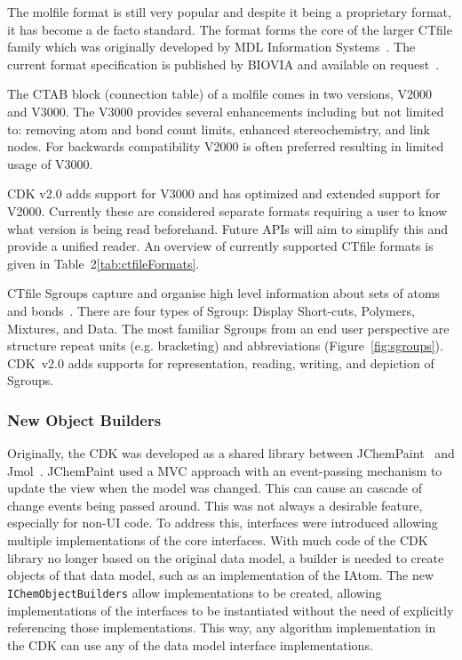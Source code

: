 \documentclass[doublespacing]{bmcart}
\def \cdkversion {v2.0}
\begin{document}
The molfile format is still very popular and despite it being a proprietary
format, it has become a de facto standard. The format forms the core of the larger
CTfile family which was originally developed by MDL Information Systems~\cite{Dalby92}. The
current format specification is published by BIOVIA and available on 
request~\cite{ctfilespec}.
 
The CTAB block (connection table) of a molfile comes in two versions, V2000
and V3000. The V3000 provides several enhancements including but not
limited to: removing atom and bond count limits, enhanced stereochemistry,
and link nodes. For backwards compatibility V2000 is often preferred resulting
in limited usage of V3000.

CDK \cdkversion{} adds support for V3000 and has optimized and extended
support for V2000. Currently these are considered separate formats requiring
a user to know what version is being read beforehand. Future APIs will aim
to simplify this and provide a unified reader. An overview of currently
supported CTfile formats is given in Table~2\ref{tab:ctfileFormats}.

CTfile Sgroups capture and organise high level information about sets of atoms
and bonds~\cite{Gushurst91}. There are four types of Sgroup: Display Short-cuts, Polymers,
Mixtures, and Data. The most familiar Sgroups from an end user perspective are structure 
repeat units (e.g. bracketing) and abbreviations (Figure~\ref{fig:sgroups}).
CDK~\cdkversion{} adds supports for representation, reading, writing, and depiction of Sgroups.


\subsubsection*{New Object Builders}

Originally, the CDK was developed as a shared library between
JChemPaint~\cite{krause2000jchempaint} and
Jmol~\cite{Willighagen2007jmol,Hanson2010}.  JChemPaint used a MVC
approach with an event-passing mechanism to update the view when the
model was changed. This can cause an cascade of change events being
passed around. This was not always a desirable feature, especially for
non-UI code. To address this, interfaces were introduced allowing
multiple implementations of the core interfaces. With much code of the CDK
library no longer based on the original data model, a builder is needed to
create objects of that data model, such as an implementation of the IAtom.
The new \texttt{IChemObjectBuilders} allow implementations to be created, allowing
implementations of the interfaces to be instantiated without the need
of explicitly referencing those implementations. This way, any algorithm
implementation in the CDK can use any of the data model interface
implementations.
\end{document}
